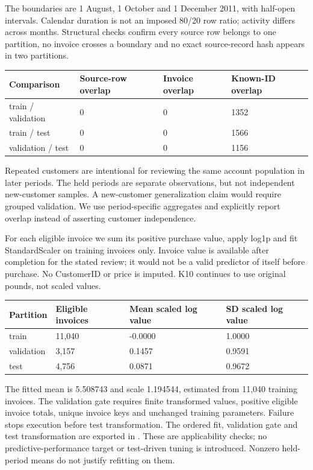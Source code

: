 \documentclass[10pt,a4paper]{article}
\newcommand{\subhead}[1]{\vspace{.2em}{\bfseries #1}\par}
\begin{document}
The boundaries are 1 August, 1 October and 1 December 2011, with half-open intervals. Calendar duration is not an imposed 80/20 row ratio; activity differs across months. Structural checks confirm every source row belongs to one partition, no invoice crosses a boundary and no exact source-record hash appears in two partitions.

\begin{tabularx}{\linewidth}{@{}YYYY@{}}
\toprule
\textbf{Comparison} & \textbf{Source-row overlap} & \textbf{Invoice overlap} & \textbf{Known-ID overlap} \\ \midrule
train / validation & 0 & 0 & 1352 \\
train / test & 0 & 0 & 1566 \\
validation / test & 0 & 0 & 1156 \\
\bottomrule\end{tabularx}

Repeated customers are intentional for reviewing the same account population in later periods. The held periods are separate observations, but not independent new-customer samples. A new-customer generalization claim would require grouped validation. We use period-specific aggregates and explicitly report overlap instead of asserting customer independence.

\subhead{Training-only fitted operation}
For each eligible invoice we sum its positive purchase value, apply log1p and fit StandardScaler on training invoices only. Invoice value is available after completion for the stated review; it would not be a valid predictor of itself before purchase. No CustomerID or price is imputed. K10 continues to use original pounds, not scaled values.

\begin{tabularx}{\linewidth}{@{}YYYY@{}}
\toprule
\textbf{Partition} & \textbf{Eligible invoices} & \textbf{Mean scaled log value} & \textbf{SD scaled log value} \\ \midrule
train & 11,040 & -0.0000 & 1.0000 \\
validation & 3,157 & 0.1457 & 0.9591 \\
test & 4,756 & 0.0871 & 0.9672 \\
\bottomrule\end{tabularx}

The fitted mean is 5.508743 and scale 1.194544, estimated from 11,040 training invoices. The validation gate requires finite transformed values, positive eligible invoice totals, unique invoice keys and unchanged training parameters. Failure stops execution before test transformation. The ordered fit, validation gate and test transformation are exported in . These are applicability checks; no predictive-performance target or test-driven tuning is introduced. Nonzero held-period means do not justify refitting on them.
\end{document}
